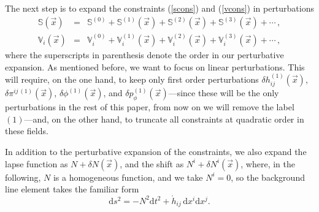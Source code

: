 \documentclass[11pt,tightenlines,eqsecnum,floats,aps,amsmath,amssymb,nofootinbib,prd,floatfix]{revtex4}
\def\d{\textrm{d}}
\def\dpp{\delta p_{\phi}}
\def\dph{\delta\phi}
\def\hz{\mathring{h}}
\def\v{\vec}
\newcommand{\bea}{\nopagebreak[3]\begin{eqnarray}}
\newcommand{\ea}{\end{eqnarray}}
\newcommand{\<}{\langle}
\renewcommand{\>}{\rangle}
\begin{document}
The next step is to expand the constraints (\ref{scons}) and (\ref{vcons}) in perturbations 
%
\bea \mathbb S(\vec x)&=&\mathbb S^{(0)}+\mathbb S^{(1)}(\v x)+\mathbb S^{(2)}(\v x)+\mathbb S^{(3)}(\v x)+\cdots\,  ,\nonumber \\
 \mathbb V_i(\v x)&=&\mathbb V_i^{(0)}+\mathbb V_i^{(1)}(\v x)+\mathbb V_i^{(2)}(\v x)+\mathbb V_i^{(3)}(\v x)+\cdots\, ,\ea
%
where the superscripts in parenthesis denote the order in our perturbative expansion. As mentioned before, we want to focus on linear perturbations. This will require, on the one hand, to keep only first order perturbations $\delta h^{(1)}_{ij}(\vec x)$, $\delta \pi^{ij\, (1)}(\vec{x})$, $\dph^{(1)}(\vec{x})$, and $ \dpp^{(1)}(\vec{x})$---since these will be the only perturbations in the rest of this paper, from now on we will  remove the label $(1)$---and, on the other hand, to truncate all constraints at quadratic order in these fields. 

In addition to the perturbative expansion of the constraints, we also expand  the lapse function as $N+\delta N(\vec x)$, and the shift as $N^i+\delta N^i(\vec x)$, where, in the following, $N$ is a homogeneous function, and we take $N^i=0$, so the background line element takes the familiar form
\begin{equation}
 \d s^2 = -N^2\d t^2 + \hz_{ij}\,  \d x^i \d x^j.
\end{equation}
\end{document}
